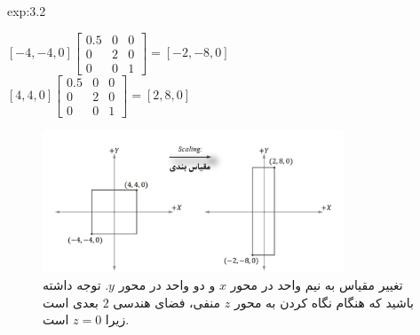 {\begin{spacing}{1.5}
\begin{example}{exp:3.2}
            \begin{center}
                $[-4,-4,0]\begin{bmatrix}
                              0.5 & 0 & 0 \\
                              0   & 2 & 0 \\
                              0   & 0 & 1
                \end{bmatrix}=[-2,-8,0]$\\$[4,4,0]\begin{bmatrix}
                                                      0.5 & 0 & 0 \\
                                                      0   & 2 & 0 \\
                                                      0   & 0 & 1
                \end{bmatrix}=[2,8,0]$
            \end{center}
            \begin{figure}[H]
                \centering
                \setlength{\belowcaptionskip}{-10pt}
                \includegraphics[width=0.8\textwidth]{Images/4/3/4.Session.1.3.2}
                \caption {تغییر مقیاس به نیم واحد در محور $x$ و دو واحد در محور $y$. توجه داشته باشید که هنگام نگاه کردن به محور $z$ منفی، فضای هندسی $2$ بعدی است زیرا $z=0$ است. \textbf{\vspace{12pt}}}
                \label{fig:4.Session.1.3.2}
            \end{figure}
        \end{example}
    \end{spacing}
}

